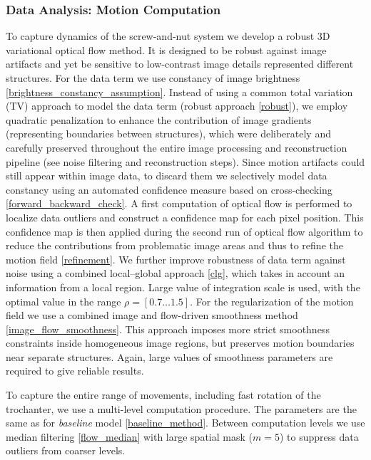 \subsubsection{Data Analysis: Motion Computation}

To capture dynamics of the screw-and-nut system we develop a robust 3D variational optical flow method. It is designed to be
robust against image artifacts and yet be sensitive to low-contrast image
details represented different structures. For the data term we use constancy of image brightness \ref{brightness_constancy_assumption}. Instead of
using a common total variation (TV) approach to model the data term (robust approach \ref{robust}), we employ
quadratic penalization to enhance the contribution of image gradients
(representing boundaries between structures), which were deliberately and carefully preserved throughout the entire image processing and reconstruction pipeline (see noise filtering and reconstruction steps).
Since motion artifacts could still appear within image data, to discard them we selectively model data constancy using an automated confidence measure based on cross-checking \ref{forward_backward_check}.  A first computation of optical flow  is performed to localize data outliers and construct a confidence map for each pixel position.  This confidence map is then applied during the second run of optical flow algorithm to reduce the contributions from problematic image areas and thus to refine the
motion field \ref{refinement}.
We further improve robustness of data term against noise using
a combined local–global approach \ref{clg}, which takes in account an information from a local region. Large value of integration scale is used, with the optimal value in the range $\rho = [0.7 \ldots 1.5]$. 
For the regularization of the motion field we use a combined image
and flow-driven smoothness method \ref{image_flow_smoothness}. This approach imposes more
strict smoothness constraints inside homogeneous image regions, but preserves
motion boundaries near separate structures. Again, large values of smoothness parameters are required to give reliable results.  

To capture the entire range of movements, including fast rotation of the
trochanter, we use a multi-level computation procedure. The parameters are the same as for \textit{baseline} model \ref{baseline_method}.  Between computation levels we use median filtering \ref{flow_median} with large spatial mask ($m=5$) to suppress data outliers from coarser levels.

